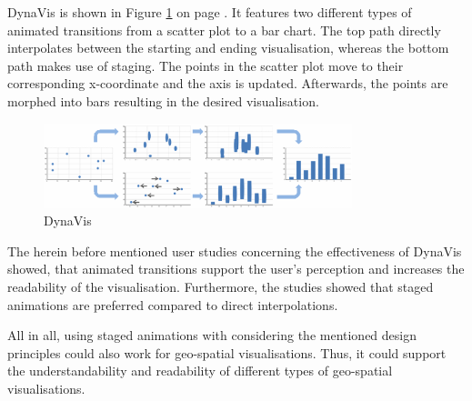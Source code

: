 DynaVis is shown in Figure \ref{fig:dynavis} on page \pageref{fig:dynavis}. It features two different types of animated transitions from a scatter plot to a bar chart. The top path directly interpolates between the starting and ending visualisation, whereas the bottom path makes use of staging. The points in the scatter plot move to their corresponding x-coordinate and the axis is updated. Afterwards, the points are morphed into bars resulting in the desired visualisation.
\cbend

\begin{figure}[!htb]
\centering
\includegraphics[width=0.8\textwidth, keepaspectratio]{images/methods/related/dynavis.png}
\caption[
    DynaVis .
]{DynaVis}
\label{fig:dynavis}
\end{figure}

\cbstart
The herein before mentioned user studies concerning the effectiveness of DynaVis showed, that animated transitions support the user's perception and increases the readability of the visualisation. Furthermore, the studies showed that staged animations are preferred compared to direct interpolations.

All in all, using staged animations with considering the mentioned design principles could also work for geo-spatial visualisations. Thus, it could support the understandability and readability of different types of geo-spatial visualisations.
\cbend